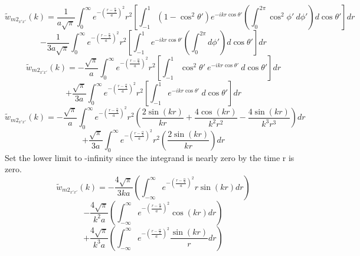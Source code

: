 \documentclass[double,12pt]{beavtex}
\begin{document}
\begin{displaymath}{\widetilde{w}_{{m2}_{x'x'}}(k)=\frac{1}{a\sqrt{\pi}}\int_{0}^{\infty}e^{-\left(\frac{r-\frac{\alpha}{2}}{a}\right)^2}r^2\left[\int_{-1}^{1}\left(1-\cos^2\theta'\right)e^{-ikr\cos\theta'}\left(\int_{0}^{2\pi}\cos^2\phi'~d{\phi'}\right)d{\cos\theta'}\right]d{r}}\end{displaymath} 
\begin{equation}{-\frac{1}{3a\sqrt{\pi}}\int_{0}^{\infty}e^{-\left(\frac{r-\frac{\alpha}{2}}{a}\right)^2}r^2\left[\int_{-1}^{1}e^{-ikr\cos\theta'}\left(\int_{0}^{2\pi}d{\phi'}\right)d{\cos\theta'}\right]d{r}}\end{equation}
\[{}\]
\color{blue}
\begin{displaymath}{\widetilde{w}_{{m2}_{x'x'}}(k)=-\frac{\sqrt{\pi}}{a}\int_{0}^{\infty}e^{-\left(\frac{r-\frac{\alpha}{2}}{a}\right)^2}r^2\left[\int_{-1}^{1}\cos^2\theta'~e^{-ikr\cos\theta'}~d{\cos\theta'}\right]d{r}}\end{displaymath} 
\begin{equation}\label{compare_equation}{+\frac{\sqrt{\pi}}{3a}\int_{0}^{\infty}e^{-\left(\frac{r-\frac{\alpha}{2}}{a}\right)^2}r^2\left[\int_{-1}^{1}e^{-ikr\cos\theta'}~d{\cos\theta'}\right]d{r}}\end{equation}
\color{black}
\[{}\]
\begin{displaymath}{\widetilde{w}_{{m2}_{x'x'}}(k)=-\frac{\sqrt{\pi}}{a}\int_{0}^{\infty}e^{-\left(\frac{r-\frac{\alpha}{2}}{a}\right)^2}r^2\left(\frac{2\sin(kr)}{kr}+\frac{4\cos(kr)}{k^2r^2}-\frac{4\sin(kr)}{k^3r^3}\right)d{r}}\end{displaymath} 
\begin{equation}{+\frac{\sqrt{\pi}}{3a}\int_{0}^{\infty}e^{-\left(\frac{r-\frac{\alpha}{2}}{a}\right)^2}r^2\left(\frac{2\sin(kr)}{kr}\right)d{r}}\end{equation}
Set the lower limit to -infinity since the integrand is nearly zero by the time r is zero. 
\begin{displaymath}{\widetilde{w}_{{m2}_{x'x'}}(k)=-\frac{4\sqrt{\pi}}{3ka}\left(\int_{-\infty}^{\infty}e^{-\left(\frac{r-\frac{\alpha}{2}}{a}\right)^2}r\sin(kr)d{r}\right)}\end{displaymath} 
\begin{displaymath}{-\frac{4\sqrt{\pi}}{k^2a}\left(\int_{-\infty}^{\infty}e^{-\left(\frac{r-\frac{\alpha}{2}}{a}\right)^2}\cos(kr)d{r}\right)}\end{displaymath} 
\begin{equation}{+\frac{4\sqrt{\pi}}{k^3a}\left(\int_{-\infty}^{\infty}e^{-\left(\frac{r-\frac{\alpha}{2}}{a}\right)^2}\frac{\sin(kr)}{r}d{r}\right)}\end{equation} 
\end{document}
